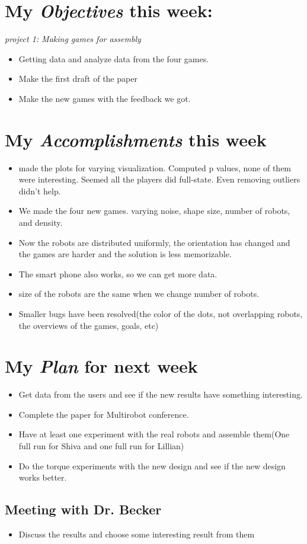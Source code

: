 \newcommand{\handoutName}{Weekly report}
\newcommand{\handoutdate}{\today}


\section{My \emph{Objectives} this week:}

\emph{project 1: Making games for assembly}
\begin{itemize}
\item Getting data and analyze data from the four games.
\item Make the first draft of the paper
\item Make the new games with the feedback we got.
\end{itemize}




\section{My \emph{Accomplishments} this week}


\begin{itemize}
\item made the plots for varying visualization. Computed p values, none of them were interesting. Seemed all the players did full-state. Even removing outliers didn't help.
\item We made the four new games. varying noise, shape size, number of robots, and density.
\item Now the robots are distributed uniformly, the orientation has changed and the games are harder and the solution is less memorizable. 
\item The smart phone also works, so we can get more data.
\item size of the robots are the same when we change number of robots.
\item Smaller bugs have been resolved(the color of the dots, not overlapping robots, the overviews of the games, goals, etc)
\end{itemize}


\section{My \emph{Plan} for next week}

\begin{itemize}
\item Get data from the users and see if the new results have something interesting.
\item Complete the paper for Multirobot conference.
\item Have at least one experiment with the real robots and assemble them(One full run for Shiva and one full run for Lillian)
\item Do the torque experiments with the new design and see if the new design works better.
\end{itemize}

\subsection{Meeting with Dr. Becker  }

\begin{itemize}
\item Discuss the results and choose some interesting result from them
\end{itemize}


